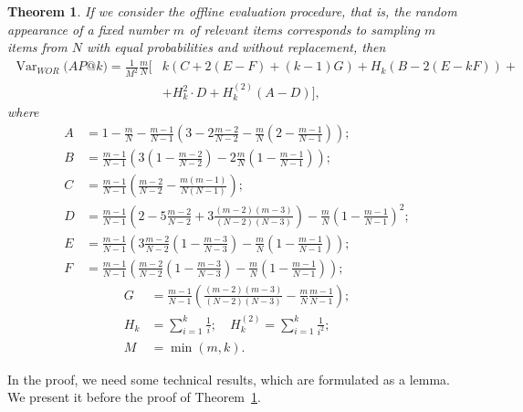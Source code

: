 \documentclass{tpms-l}
\newtheorem{theorem}{Theorem}[section]
\theoremstyle{definition}
\theoremstyle{remark}
\numberwithin{equation}{section}
\begin{document}
\begin{theorem} \label{th2wor} If we consider the offline evaluation procedure, that is, the random appearance of a fixed number $m$ of relevant items corresponds to sampling $m$ items from $N$ with equal probabilities and without replacement, then 
\begin{equation*}
\begin{split} \operatorname{Var}_{WOR}\big(AP@k\big)=\frac{1}{M^2} \frac{m}{N}\Bigg[& k(C+2(E-F) + (k-1)G) + H_k(B-2(E-kF))+\\ 
& + H_k^2 \cdot D + H_k^{\left(2\right)}(A-D) \Bigg],
\end{split}
\end{equation*}
where 
\begin{align*}
 A & =  1- \frac{m}{N}-\frac{m-1}{N-1} \left(3-2\frac{m-2}{N-2}-\frac{m}{N}\left(2-\frac{m-1}{N-1}\right)\right); \\
 B & =  \frac{m-1}{N-1}\left(3\left(1-\frac{m-2}{N-2}\right)-2\frac{m}{N}\left(1-\frac{m-1}{N-1}\right)\right);\\
C & = \frac{m-1}{N-1}\left(\frac{m-2}{N-2}-\frac{m(m-1)}{N(N-1)}\right);\\
D & = \frac{m-1}{N-1}\left(2-5\frac{m-2}{N-2}+3\frac{(m-2)(m-3)}{(N-2)(N-3)}\right)-\frac{m}{N}\left(1-\frac{m-1}{N-1}\right)^2;\\
E& = \frac{m-1}{N-1}\left(3\frac{m-2}{N-2}\left(1-\frac{m-3}{N-3}\right)-\frac{m}{N}\left(1-\frac{m-1}{N-1}\right)\right);\\
F &= \frac{m-1}{N-1}\left(\frac{m-2}{N-2}\left(1-\frac{m-3}{N-3}\right)-\frac{m}{N}\left(1-\frac{m-1}{N-1}\right)\right); 
\end{align*}
 \begin{align*}
G & = \frac{m-1}{N-1}\left(\frac{(m-2)(m-3)}{(N-2)(N-3)}-\frac{m}{N}\frac{m-1}{N-1}\right);\\
H_{k} & = \sum_{i=1}^k \frac{1}{i}; \quad H^{(2)}_{k} = \sum_{i=1}^k \frac{1}{i^2};\\
M & = \min(m,k). 
\end{align*}
\end{theorem}
In the proof, we need some technical results, which are formulated as a lemma.  We present it before the proof of Theorem~\ref {th2wor}. 
\end{document}
